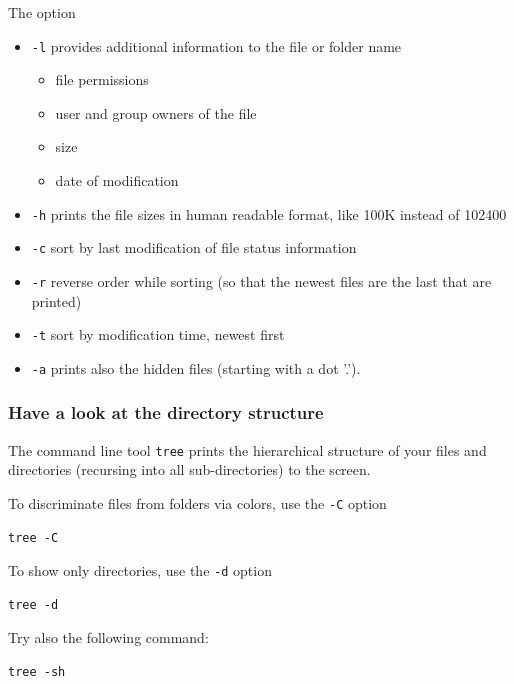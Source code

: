 \documentclass[11pt]{article}
\begin{document}
The option
\begin{itemize}
\item \texttt{-l} provides additional information to the file or folder name
\begin{itemize}
\item file permissions
\item user and group owners of the file
\item size
\item date of modification
\end{itemize}
\item \texttt{-h} prints the file sizes in human readable format, like 100K instead of 102400
\item \texttt{-c} sort by last modification of file status information
\item \texttt{-r} reverse order while sorting (so that the newest files are the last that are printed)
\item \texttt{-t} sort by modification time, newest first
\item \texttt{-a} prints also the hidden files (starting with a dot '.').
\end{itemize}

\subsubsection{Have a look at the directory structure}
\label{sec-2-1-5}
The command line tool \texttt{tree} prints the hierarchical structure of your
files and directories (recursing into all sub-directories) to the screen.

To discriminate files from folders via colors, use the \texttt{-C} option

\begin{verbatim}
tree -C
\end{verbatim}

To show only directories, use the \texttt{-d} option

\begin{verbatim}
tree -d
\end{verbatim}



Try also the following command:

\begin{verbatim}
tree -sh
\end{verbatim}
\end{document}

